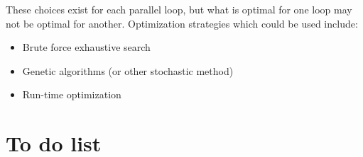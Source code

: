 \documentclass[12pt]{article}
\begin{document}
These choices exist for each parallel loop, but what is optimal 
for one loop may not be optimal for another.
Optimization strategies which could be used include:
\begin{itemize}
\item
Brute force exhaustive search

%

\item
Genetic algorithms (or other stochastic method)


\item
Run-time optimization


\end{itemize}


\newpage

\section{To do list}
\end{document}
